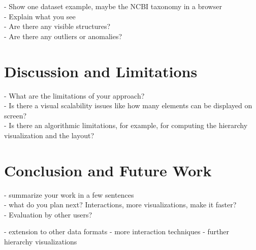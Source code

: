 \documentclass[journal]{vgtc}                %
\begin{document}
- Show one dataset example, maybe the NCBI taxonomy in a browser\\
- Explain what you see\\
- Are there any visible structures?\\
- Are there any outliers or anomalies?


\section{Discussion and Limitations}

- What are the limitations of your approach?\\
- Is there a visual scalability issues like how many elements can be displayed on screen?\\
- Is there an algorithmic limitations, for example, for computing the hierarchy visualization and the layout? 



\section{Conclusion and Future Work}

- summarize your work in a few sentences\\
- what do you plan next? Interactions, more visualizations, make it faster?\\
- Evaluation by other users?


- extension to other data formats
- more interaction techniques
- further hierarchy visualizations




%

%
%
%


\end{document}
